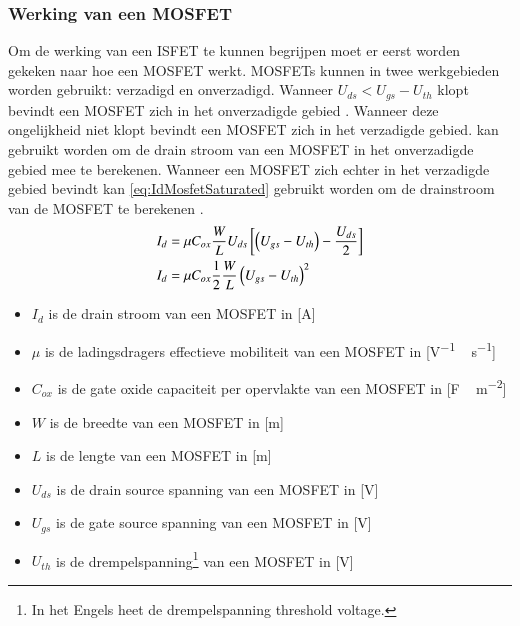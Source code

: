 \subsubsection{Werking van een MOSFET}
Om de werking van een ISFET te kunnen begrijpen moet er eerst worden gekeken naar hoe een MOSFET werkt.
MOSFETs kunnen in twee werkgebieden worden gebruikt: verzadigd en onverzadigd. Wanneer $U_{ds}<U_{gs}-U_{th}$ klopt bevindt een MOSFET zich in het onverzadigde gebied \cite{bergveld1985impactOfMosfetBasedSensors,inleidingInDeElektronicaWissenburgh}. Wanneer deze ongelijkheid niet klopt bevindt een MOSFET zich in het verzadigde gebied.  kan gebruikt worden om de drain stroom van een MOSFET in het onverzadigde gebied mee te berekenen. Wanneer een MOSFET zich echter in het verzadigde gebied bevindt kan \cref{eq:IdMosfetSaturated} gebruikt worden om de drainstroom van de MOSFET te berekenen \cite{elbasfun,inleidingInDeElektronicaWissenburgh,bergveld1985impactOfMosfetBasedSensors,isfetAsAnElectronicDevice,DonaldNeamenSemiconductorPhysicsAndDevicesBasicPrinciples}.
\begin{align}
    I_d{}&={}\mu C_{ox}\frac{W}{L}U_{ds}\left[\left(U_{gs}-U_{th}\right)-\frac{U_{ds}}{2}\right]
    \tagaddtext{[\si{\ampere}]} \label{eq:IdMosfetUnsaturated}\\
    I_d{}&={}\mu C_{ox}\frac{1}{2}\frac{W}{L}\left(U_{gs}-U_{th}\right)^2
    \tagaddtext{[\si{\ampere}]} \label{eq:IdMosfetSaturated}
\end{align}
\begin{itemize}
    \item $I_d$ is de drain stroom van een MOSFET in [\si{\ampere}]
    \item $\mu$ is de ladingsdragers effectieve mobiliteit van een MOSFET in [\si{\volt^{-1}\,\second^{-1}}]
    \item $C_{ox}$ is de gate oxide capaciteit per opervlakte van een MOSFET in [\si{\farad\,\meter^{-2}}]
    \item $W$ is de breedte van een MOSFET in [\si{\meter}]
    \item $L$ is de lengte van een MOSFET in [\si{\meter}]
    \item $U_{ds}$ is de drain source spanning van een MOSFET in [\si{\volt}]
    \item $U_{gs}$ is de gate source spanning van een MOSFET in [\si{\volt}]
    \item $U_{th}$ is de drempelspanning\footnote{In het Engels heet de drempelspanning threshold voltage.} van een MOSFET in [\si{\volt}]
\end{itemize}

